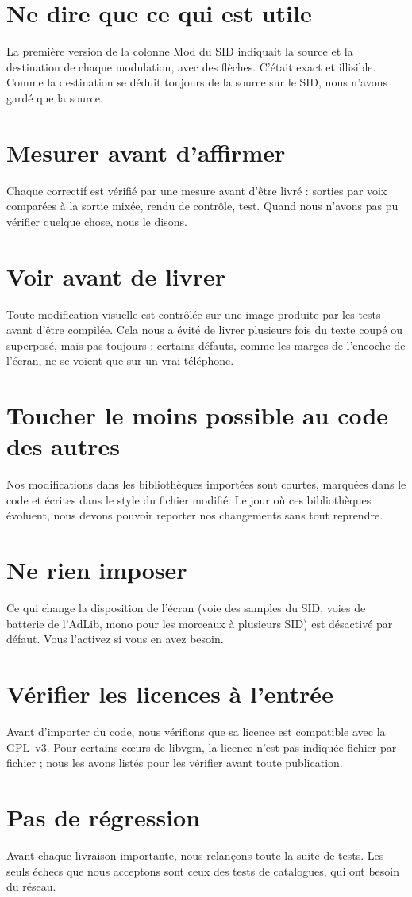 \section{Ne dire que ce qui est utile}
La première version de la colonne Mod du SID indiquait la source et la destination de chaque modulation, avec des
flèches. C'était exact et illisible. Comme la destination se déduit toujours de la source sur le SID, nous n'avons
gardé que la source.

\section{Mesurer avant d'affirmer}
Chaque correctif est vérifié par une mesure avant d'être livré : sorties par voix comparées à la sortie mixée, rendu
de contrôle, test. Quand nous n'avons pas pu vérifier quelque chose, nous le disons.

\section{Voir avant de livrer}
Toute modification visuelle est contrôlée sur une image produite par les tests avant d'être compilée. Cela nous a
évité de livrer plusieurs fois du texte coupé ou superposé, mais pas toujours : certains défauts, comme les marges de
l'encoche de l'écran, ne se voient que sur un vrai téléphone.

\section{Toucher le moins possible au code des autres}
Nos modifications dans les bibliothèques importées sont courtes, marquées dans le code et écrites dans le style du
fichier modifié. Le jour où ces bibliothèques évoluent, nous devons pouvoir reporter nos changements sans tout
reprendre.

\section{Ne rien imposer}
Ce qui change la disposition de l'écran (voie des samples du SID, voies de batterie de l'AdLib, mono pour les
morceaux à plusieurs SID) est désactivé par défaut. Vous l'activez si vous en avez besoin.

\section{Vérifier les licences à l'entrée}
Avant d'importer du code, nous vérifions que sa licence est compatible avec la GPL~v3. Pour certains cœurs de libvgm,
la licence n'est pas indiquée fichier par fichier ; nous les avons listés pour les vérifier avant toute publication.

\section{Pas de régression}
Avant chaque livraison importante, nous relançons toute la suite de tests. Les seuls échecs que nous acceptons sont
ceux des tests de catalogues, qui ont besoin du réseau.
